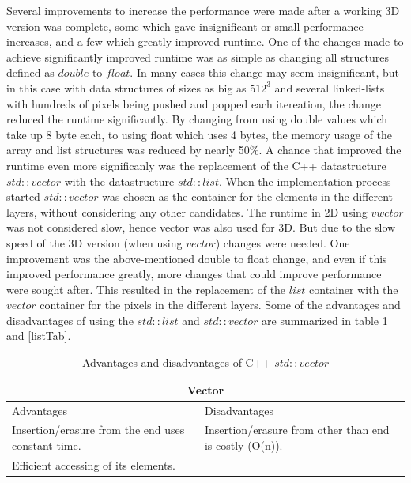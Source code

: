 Several improvements to increase the performance were made after a working 3D version was complete, some which gave insignificant or small performance increases, and a few which greatly improved runtime. One of the changes made to achieve significantly improved runtime was as simple as changing all structures defined as $double$ to $float$. In many cases this change may seem insignificant, but in this case with data structures of sizes as big as $512^3$ and several linked-lists with hundreds of pixels being pushed and popped each itereation, the change reduced the runtime significantly. By changing from using double values which take up 8 byte each, to using float which uses 4 bytes, the memory usage of the array and list structures was reduced by nearly 50\%. A chance that improved the runtime even more significanly was the replacement of the C++ datastructure $std::vector$ with the datastructure $std::list$. When the implementation process started $std::vector$ was chosen as the container for the elements in the different layers, without considering any other candidates. The runtime in 2D using $vwctor$ was not considered slow, hence vector was also used for 3D. But due to the slow speed of the 3D version (when using $vector$) changes were needed. One improvement was the above-mentioned double to float change, and even if this improved performance greatly, more changes that could improve performance were sought after. This resulted in the replacement of the $list$ container with the $vector$ container for the pixels in the different layers. Some of the advantages and disadvantages of using the $std::list$ and $std::vector$ are summarized in table \ref{vectorTab} and \ref{listTab}.

\begin{table}[h!]
	\begin{tabular}{| p{5.85cm} | p{5.85cm} |} 
	\hline
	\multicolumn{2}{|c|}{Vector} \\
	\hline
	Advantages & Disadvantages \\
	\hline
	Insertion/erasure from the end uses constant time. &  Insertion/erasure from other than end is costly (O(n)). \\
	Efficient accessing of its elements. & \\
	\hline
	\end{tabular}
	\caption{Advantages and disadvantages of C++ $std::vector$}
	\label{vectorTab}
\end{table}

